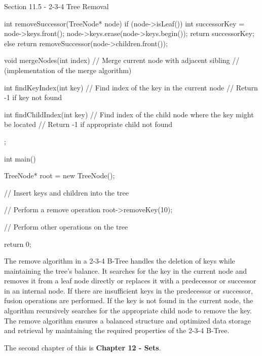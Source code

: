\begin{notes}{Section 11.5 - 2-3-4 Tree Removal}
\begin{highlight}
\begin{code}[C++]
{            int removeSuccessor(TreeNode* node) {
                if (node->isLeaf()) {
                    int successorKey = node->keys.front();
                    node->keys.erase(node->keys.begin());
                    return successorKey;
                } else {
                    return removeSuccessor(node->children.front());
                }
            }
        
            void mergeNodes(int index) {
                // Merge current node with adjacent sibling
                // (implementation of the merge algorithm)
            }
        
            int findKeyIndex(int key) {
                // Find index of the key in the current node
                // Return -1 if key not found
            }
        
            int findChildIndex(int key) {
                // Find index of the child node where the key might be located
                // Return -1 if appropriate child not found
            }
        };
        
        int main() {
            TreeNode* root = new TreeNode();
        
            // Insert keys and children into the tree
        
            // Perform a remove operation
            root->removeKey(10);
        
            // Perform other operations on the tree
        
            return 0;
        }        
        \end{code}
        The remove algorithm in a 2-3-4 B-Tree handles the deletion of keys while maintaining the tree's balance. It searches for the key in the current node and removes it from a leaf node directly or replaces it with a predecessor or successor in an internal node. If there are insufficient keys in the predecessor or successor, fusion 
        operations are performed. If the key is not found in the current node, the algorithm recursively searches for the appropriate child node to remove the key. The remove algorithm ensures a balanced structure and optimized data storage and retrieval by maintaining the required properties of the 2-3-4 B-Tree.
    \end{highlight}
\end{notes}

The second chapter of this is \textbf{Chapter 12 - Sets}.

